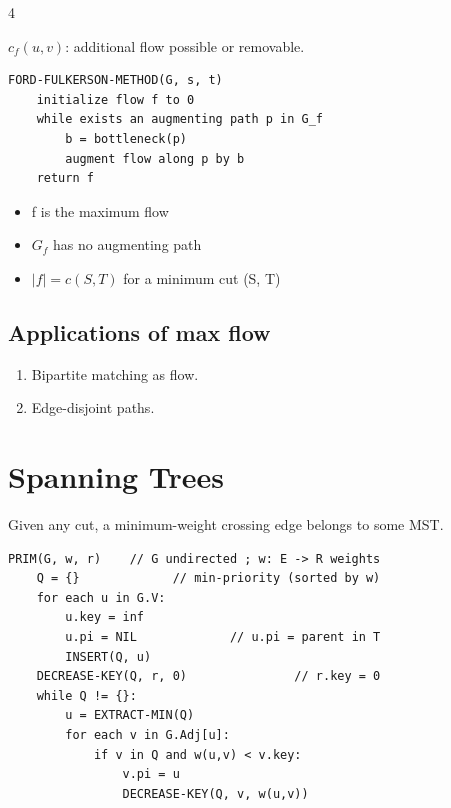 \documentclass[8pt,a4paper,landscape]{extarticle}
\begin{document}
\begin{multicols*}{4}
\begin{prop}[title={Residual network $G_f=(V,E_f)$}]
$c_f(u,v)$: additional flow possible or removable.
\end{prop}

\begin{lstlisting}
FORD-FULKERSON-METHOD(G, s, t)
    initialize flow f to 0
    while exists an augmenting path p in G_f
        b = bottleneck(p)
        augment flow along p by b
    return f
\end{lstlisting}

\begin{thm}[title=Max-flow min-cut theorem ($\Leftrightarrow$)]
\begin{itemize}
  \item f is the maximum flow
  \item $G_f$ has no augmenting path
  \item $|f| = c(S,T)$ for a minimum cut (S, T)
\end{itemize}
\end{thm}

\subsection{Applications of max flow}
\begin{enumerate}
  \item Bipartite matching as flow.
  \item Edge-disjoint paths.
\end{enumerate}

\section{Spanning Trees}

\begin{thm}[title=Cut property (safe edge)]
Given any cut, a minimum-weight crossing edge belongs to some MST.
\end{thm}

\begin{lstlisting}
PRIM(G, w, r)    // G undirected ; w: E -> R weights
    Q = {}             // min-priority (sorted by w)
    for each u in G.V:
        u.key = inf
        u.pi = NIL             // u.pi = parent in T
        INSERT(Q, u)
    DECREASE-KEY(Q, r, 0)               // r.key = 0
    while Q != {}:
        u = EXTRACT-MIN(Q)
        for each v in G.Adj[u]:
            if v in Q and w(u,v) < v.key:
                v.pi = u
                DECREASE-KEY(Q, v, w(u,v))
\end{lstlisting}


\end{multicols*}
\end{document}
